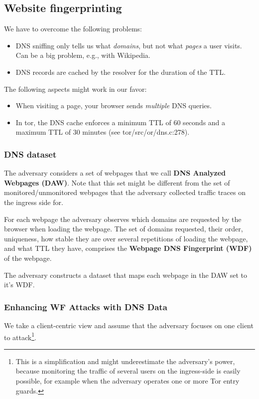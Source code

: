 \subsection{Website fingerprinting}
We have to overcome the following problems:
\begin{itemize}
	\item DNS sniffing only tells us what \emph{domains}, but not what
		\emph{pages} a user visits.  Can be a big problem, e.g., with Wikipedia.
	\item DNS records are cached by the resolver for the duration of the TTL.
\end{itemize}

The following aspects might work in our favor:
\begin{itemize}
	\item When visiting a page, your browser sends \emph{multiple} DNS queries.
	\item In tor, the DNS cache enforces a minimum TTL of 60 seconds and a maximum
	TTL of 30 minutes (see tor/src/or/dns.c:278).
\end{itemize}


\subsubsection{DNS dataset}

The adversary considers a set of webpages that we call \textbf{DNS
Analyzed Webpages (DAW)}. Note that this set might be different from the
set of monitored/unmonitored webpages that the adversary collected
traffic traces on the ingress side for. 

For each webpage the adversary observes which domains are requested by
the browser when loading the webpage. The set of domains requested,
their order, uniqueness, how stable they are over several repetitions of
loading the webpage, and what TTL they have, comprises the
\textbf{Webpage DNS Fingerprint (WDF)} of the webpage.

The adversary constructs a dataset that maps each webpage in the DAW set
to it's WDF. 


\subsubsection{Enhancing WF Attacks with DNS Data}

We take a client-centric view and assume that the adversary focuses on
one client to attack\footnote{This is a simplification and might underestimate
the adversary's power, because monitoring the traffic of several users
on the ingress-side is easily possible, for example when the adversary
operates one or more Tor entry guards.}.

